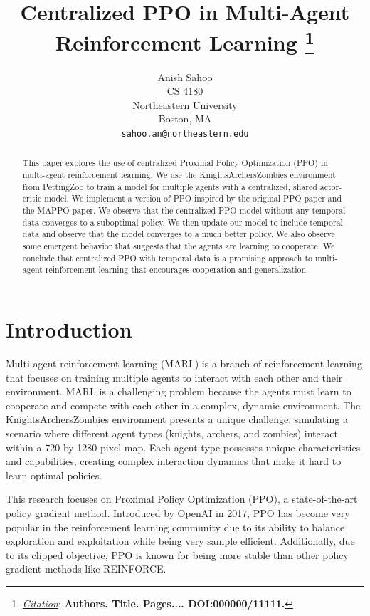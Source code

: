 \documentclass{article}
\title{Centralized PPO in Multi-Agent Reinforcement Learning
\thanks{\textit{\underline{Citation}}: 
\textbf{Authors. Title. Pages.... DOI:000000/11111.}} 
}
\author{
  Anish Sahoo \\
  CS 4180 \\
  Northeastern University \\
  Boston, MA\\
  \texttt{sahoo.an@northeastern.edu} \\
}
\begin{document}
\maketitle


\begin{abstract}
This paper explores the use of centralized Proximal Policy Optimization (PPO) in multi-agent 
reinforcement learning. We use the KnightsArchersZombies environment from PettingZoo to train 
a model for multiple agents with a centralized, shared actor-critic model. We implement a version of PPO inspired
by the original PPO paper and the MAPPO paper. We observe that the centralized PPO model without
any temporal data converges to a suboptimal policy. We then update our model to include temporal data
and observe that the model converges to a much better policy. We also observe some emergent behavior
that suggests that the agents are learning to cooperate. We conclude that centralized PPO with temporal
data is a promising approach to multi-agent reinforcement learning that encourages cooperation 
and generalization.

\end{abstract}




\section{Introduction}
Multi-agent reinforcement learning (MARL) is a branch of reinforcement learning that focuses on
training multiple agents to interact with each other and their environment. MARL is a challenging
problem because the agents must learn to cooperate and compete with each other in a complex,
dynamic environment. The KnightsArchersZombies environment presents a unique challenge, simulating 
a scenario where different agent types (knights, archers, and zombies) interact 
within a 720 by 1280 pixel map. Each agent type possesses unique characteristics 
and capabilities, creating complex interaction dynamics that make it hard to learn optimal policies.

This research focuses on Proximal Policy Optimization (PPO), a 
state-of-the-art policy gradient method. Introduced by OpenAI \cite{DBLP:journals/corr/SchulmanWDRK17} in 2017, 
PPO has become very popular in the reinforcement learning community 
due to its ability to balance exploration and 
exploitation while being very sample efficient. Additionally, due to its clipped objective,
PPO is known for being more stable than other policy gradient methods like REINFORCE.
\end{document}
